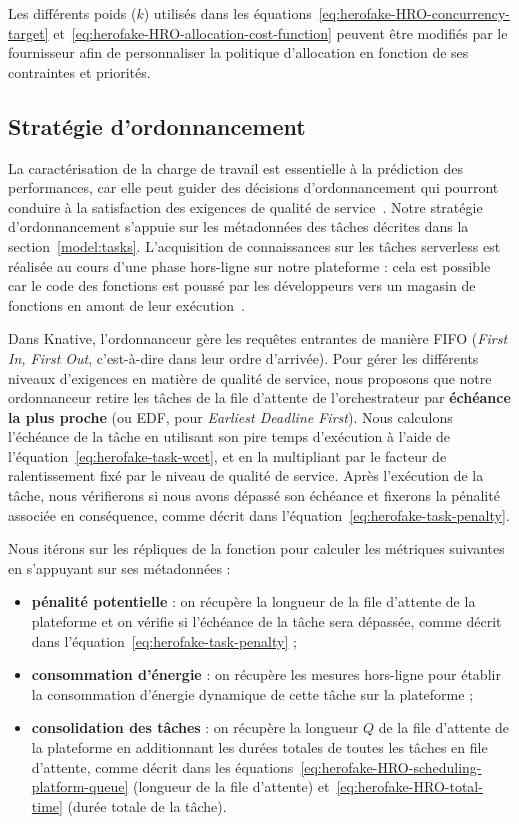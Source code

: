 Les différents poids ($k$) utilisés dans les équations~\ref{eq:herofake-HRO-concurrency-target} et~\ref{eq:herofake-HRO-allocation-cost-function} peuvent être modifiés par le fournisseur afin de personnaliser la politique d'allocation en fonction de ses contraintes et priorités.

\subsection{Stratégie d'ordonnancement} \label{section:herofake-scheduling-strategy}

La caractérisation de la charge de travail est essentielle à la prédiction des performances, car elle peut guider des décisions d'ordonnancement qui pourront conduire à la satisfaction des exigences de qualité de service~\cite{mampageHolisticViewResource2022}. Notre stratégie d'ordonnancement s'appuie sur les métadonnées des tâches décrites dans la section~\ref{model:tasks}. L'acquisition de connaissances sur les tâches serverless est réalisée au cours d'une phase hors-ligne sur notre plateforme : cela est possible car le code des fonctions est poussé par les développeurs vers un magasin de fonctions en amont de leur exécution~\cite{shahradServerlessWildCharacterizing}.

Dans Knative, l'ordonnanceur gère les requêtes entrantes de manière FIFO (\textit{First In, First Out}, c'est-à-dire dans leur ordre d'arrivée). Pour gérer les différents niveaux d'exigences en matière de qualité de service, nous proposons que notre ordonnanceur retire les tâches de la file d'attente de l'orchestrateur par \textbf{échéance la plus proche} (ou EDF, pour \textit{Earliest Deadline First}). Nous calculons l'échéance de la tâche en utilisant son pire temps d'exécution à l'aide de l'équation~\ref{eq:herofake-task-wcet}, et en la multipliant par le facteur de ralentissement fixé par le niveau de qualité de service. Après l'exécution de la tâche, nous vérifierons si nous avons dépassé son échéance et fixerons la pénalité associée en conséquence, comme décrit dans l'équation~\ref{eq:herofake-task-penalty}. 

Nous itérons sur les répliques de la fonction pour calculer les métriques suivantes en s'appuyant sur ses métadonnées :

\begin{itemize}
    \item \textbf{pénalité potentielle} : on récupère la longueur de la file d'attente de la plateforme et on vérifie si l'échéance de la tâche sera dépassée, comme décrit dans l'équation~\ref{eq:herofake-task-penalty} ;
    \item \textbf{consommation d'énergie} : on récupère les mesures hors-ligne pour établir la consommation d'énergie dynamique de cette tâche sur la plateforme ;
    \item \textbf{consolidation des tâches} : on récupère la longueur $Q$ de la file d'attente de la plateforme en additionnant les durées totales de toutes les tâches en file d'attente, comme décrit dans les équations~\ref{eq:herofake-HRO-scheduling-platform-queue} (longueur de la file d'attente) et~\ref{eq:herofake-HRO-total-time} (durée totale de la tâche). 
\end{itemize}

